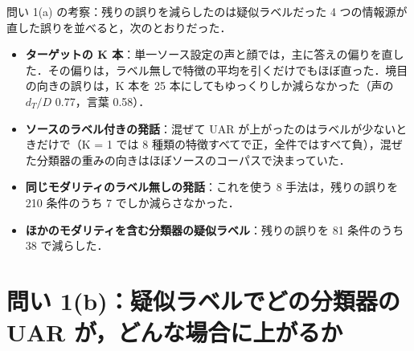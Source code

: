 \begin{frame}{問い 1(a) の考察：残りの誤りを減らしたのは疑似ラベルだった}
\scriptsize
4 つの情報源が直した誤りを並べると，次のとおりだった．
\begin{itemize}\setlength\itemsep{3pt}
\item \textbf{ターゲットの K 本}：単一ソース設定の声と顔では，主に答えの偏りを直した．その偏りは，ラベル無しで特徴の平均を引くだけでもほぼ直った．境目の向きの誤りは，K 本を 25 本にしてもゆっくりしか減らなかった（声の $d_T/D$ 0.77，言葉 0.58）．
\item \textbf{ソースのラベル付きの発話}：混ぜて UAR が上がったのはラベルが少ないときだけで（K = 1 では 8 種類の特徴すべてで正，全件ではすべて負），混ぜた分類器の重みの向きはほぼソースのコーパスで決まっていた．
\item \textbf{同じモダリティのラベル無しの発話}：これを使う 8 手法は，残りの誤りを 210 条件のうち 7 でしか減らさなかった．
\item \textbf{ほかのモダリティを含む分類器の疑似ラベル}：残りの誤りを 81 条件のうち 38 で減らした．
\end{itemize}
\end{frame}

\section{問い 1(b)：疑似ラベルでどの分類器の UAR が，どんな場合に上がるか}

